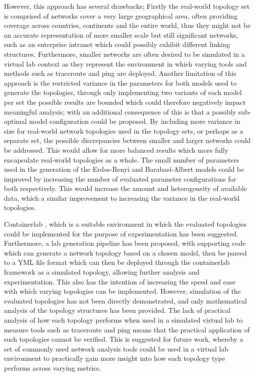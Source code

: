 However, this approach has several drawbacks; Firstly the real-world topology set is comprised of networks cover a very large geographical area, often providing coverage across countries, continents and the entire world, thus they might not be an accurate representation of more smaller scale but still significant networks, such as an enterprise intranet which could possibly exhibit different linking structures. Furthermore, smaller networks are often desired to be simulated in a virtual lab context as they represent the environment in which varying tools and methods such as traceroute \cite{jacobson1989traceroute} and ping are deployed. Another limitation of this approach is the restricted variance in the parameters for both models used to generate the topologies, through only implementing two variants of each model per set the possible results are bounded which could therefore negatively impact meaningful analysis; with an additional consequence of this is that a possibly sub-optimal model configuration could be proposed. By including more variance in size for real-world network topologies used in the topology sets, or perhaps as a separate set, the possible discrepancies between smaller and larger networks could be addressed. This would allow for more balanced results which more fully encapsulate real-world topologies as a whole. The small number of parameters used in the generation of the Erdos-Renyi and Barabasi-Albert models could be improved by increasing the number of evaluated parameter configurations for both respectively. This would increase the amount and heterogeneity of available data, which a similar improvement to increasing the variance in the real-world topologies. 

Containerlab \cite{containerlab}, which is a suitable environment in which the evaluated topologies could be implemented for the purpose of experimentation has been suggested. Furthermore, a lab generation pipeline has been proposed, with supporting code which can generate a network topology based on a chosen model, then be parsed to a YML file format which can then be deployed through the containerlab \cite{containerlab} framework as a simulated topology, allowing further analysis and experimentation. This also has the intention of increasing the speed and ease with which varying topologies can be implemented.  However, simulation of the evaluated topologies has not been directly demonstrated, and only mathematical analysis of the topology structures has been provided. The lack of practical analysis of how each topology performs when used in a simulated virtual lab to measure tools such as traceroute and ping means that the practical application of such topologies cannot be verified. This is suggested for future work, whereby a set of commonly used network analysis tools could be used in a virtual lab environment to practically gain more insight into how each topology type performs across varying metrics. 

